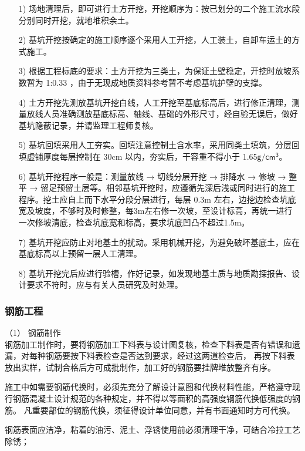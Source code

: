 \begin{itemize}
    \item [1)]场地清理后，即可进行土方开挖，开挖顺序为：按已划分的二个施工流水段分别同时开挖，就地堆积余土。
    \item [2)]基坑开挖按确定的施工顺序逐个采用人工开挖，人工装土，自卸车运土的方式施工。
    \item [3)]根据工程标底的要求：土方开挖为三类土，为保证土壁稳定，开挖时放坡系数暂为 1:0.33 ，由于无现成地质资料参考暂不考虑基坑护壁的支撑。
    \item [4)]土方开挖先测放基坑开挖白线，人工开挖至基底标高后，进行修正清理，测量放线人员准确测放基底标高、轴线、基础的外形尺寸，经自验无误后，做好基坑隐蔽记录，并请监理工程师复核。
    \item [5)]基坑回填采用人工夯实。回填注意控制土含水率，采用同类土填筑，分层回填虚铺厚度每层控制在 30cm 以内，夯实后，干容重不得小于 1.65$\mathsf{g/cm^3}$。
    \item [6)]基坑开挖程序一般是：测量放线 → 切线分层开挖 → 排降水 → 修坡 → 整平 → 留足预留土层等。相邻基坑开挖时，应遵循先深后浅或同时进行的施工程序。挖土应自上而下水平分段分层进行，每层 0.3m 左右，边挖边检查坑底宽及坡度，不够时及时修整，每3m左右修一次坡，至设计标高，再统一进行一次修坡清底，检查坑底宽和标高，要求坑底凹凸不超过1.5m。
    \item [7)]基坑开挖应防止对地基土的扰动。采用机械开挖，为避免破坏基底土，应在基底标高以上预留一层人工清理。
    \item [8)]基坑开挖完后应进行验槽，作好记录，如发现地基土质与地质勘探报告、设计要求不符时，应与有关人员研究及时处理。
\end{itemize}

\subsubsection{钢筋工程}

（1） 钢筋制作\\

钢筋加工制作时，要将钢筋加工下料表与设计图复核，检查下料表是否有错误和遗漏，对每种钢筋要按下料表检查是否达到要求，经过这两道检查后，
再按下料表放出实样，试制合格后方可成批制作，加工好的钢筋要挂牌堆放整齐有序。

施工中如需要钢筋代换时，必须先充分了解设计意图和代换材料性能，严格遵守现行钢筋混凝土设计规范的各种规定，并不得以等面积的高强度钢筋代换低强度的钢筋。
凡重要部位的钢筋代换，须征得设计单位同意，并有书面通知时方可代换。

 钢筋表面应洁净，粘着的油污、泥土、浮锈使用前必须清理干净，可结合冷拉工艺除锈；

